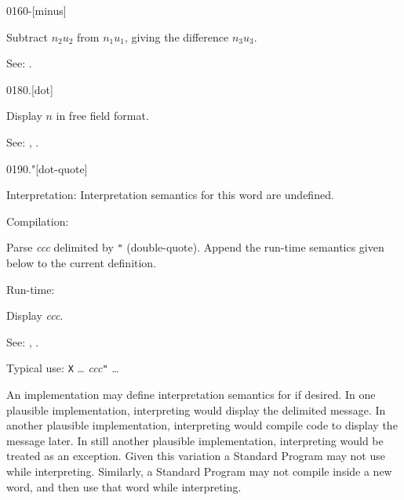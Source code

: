 \begin{newword}{0160}{-}[minus]

	Subtract $n_2$\textbar$u_2$ from $n_1$\textbar$u_1$, giving the
	difference $n_3$\textbar$u_3$.

\item[See:]
	.
\end{newword}


\begin{newword}{0180}{.}[dot]

	Display $n$ in free field format.

\item[See:]
	,
	.
\end{newword}


\begin{newword*}[.q]{0190}{."}[dot-quote]
\item[Interpretation:]
	Interpretation semantics for this word are undefined.

\item[Compilation:]

	Parse \emph{ccc} delimited by \texttt{"} (double-quote).
	Append the run-time semantics given below to the current
	definition.

\item[Run-time:]
	\stack{}{}

	Display \emph{ccc}.

\item[See:]
	,
	.

	\begin{rationale} %
		Typical use:
			\word{:} \texttt{X} {\ldots}
				 \emph{ccc}\texttt{"} {\ldots}
			\word{;}

		An implementation may define interpretation semantics for
		 if desired. In one plausible implementation,
		interpreting  would display the delimited message.
		In another plausible implementation, interpreting 
		would compile code to display the message later. In still
		another plausible implementation, interpreting  would
		be treated as an exception. Given this variation a Standard
		Program may not use  while interpreting. Similarly,
		a Standard Program may not compile  
		inside a new word, and then use that word while interpreting.
	\end{rationale}
\end{newword*}


